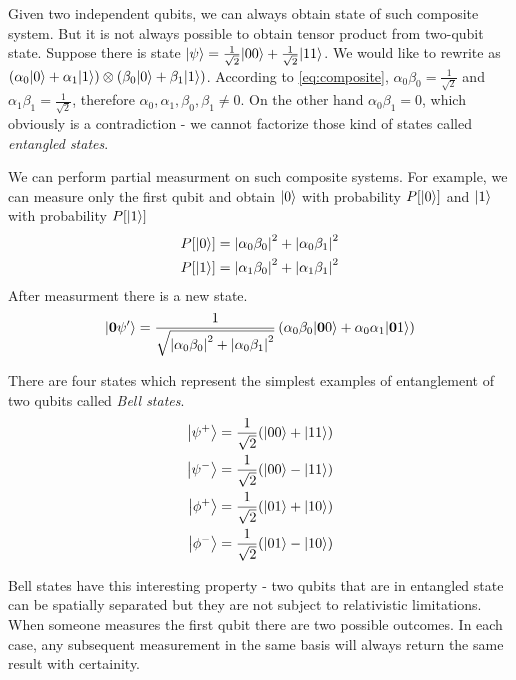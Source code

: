 \begin{multicols*}{2}
Given two independent qubits, we can always obtain state of such composite system. But it is not always possible to obtain tensor product from two-qubit state. Suppose there is state ${\left\vert{\psi}\right\rangle} = \frac{1}{\sqrt{2}}{\left\vert{00}\right\rangle}+\frac{1}{\sqrt{2}}{\left\vert{11}\right\rangle}$. We would like to rewrite as $(\alpha_0{\left\vert{0}\right\rangle} + \alpha_1{\left\vert{1}\right\rangle})\otimes(\beta_0{\left\vert{0}\right\rangle} + \beta_1{\left\vert{1}\right\rangle})$. According to \eqref{eq:composite}, $\alpha_0\beta_0 = \frac{1}{\sqrt{2}}$ and $\alpha_1\beta_1 = \frac{1}{\sqrt{2}}$, therefore $\alpha_0, \alpha_1, \beta_0, \beta_1 \neq 0$. On the other hand $\alpha_0\beta_1 = 0$, which obviously is a contradiction - we cannot factorize those kind of states called \textit{entangled states}.

We can perform partial measurment on such composite systems. For example, we can measure only the first qubit  and obtain ${\left\vert{0}\right\rangle}$ with probability $P[{\left\vert{0}\right\rangle}]$ and ${\left\vert{1}\right\rangle}$ with probability $P[{\left\vert{1}\right\rangle}]$
\begin{align*}
P[{\left\vert{0}\right\rangle}] = \left| \alpha_0\beta_0 \right|^2 + \left| \alpha_0\beta_1 \right|^2\\
P[{\left\vert{1}\right\rangle}] = \left| \alpha_1\beta_0 \right|^2 + \left| \alpha_1\beta_1 \right|^2
\end{align*}
After measurment there is a new state.
\begin{align*}
{\left\vert{\boldsymbol{0}\psi'}\right\rangle} = \frac{1}{\sqrt{ \left| \alpha_0\beta_0 \right|^2 + \left| \alpha_0\beta_1 \right|^2}}\left(\alpha_0\beta_0{\left\vert{\boldsymbol{0}0}\right\rangle} + \alpha_0\alpha_1{\left\vert{\boldsymbol{0}1}\right\rangle}\right)
\end{align*}

There are four states which represent the simplest examples of entanglement of two qubits called \textit{Bell states}.
\begin{align*}
\begin{split}
\label{eq:bell_states}
{\left\vert{\psi^+}\right\rangle} &=  \frac{1}{\sqrt{2}}({\left\vert{00}\right\rangle}+{\left\vert{11}\right\rangle})\\
{\left\vert{\psi^-}\right\rangle} &=  \frac{1}{\sqrt{2}}({\left\vert{00}\right\rangle}-{\left\vert{11}\right\rangle})\\
{\left\vert{\phi^+}\right\rangle} &=  \frac{1}{\sqrt{2}}({\left\vert{01}\right\rangle}+{\left\vert{10}\right\rangle})\\
{\left\vert{\phi^-}\right\rangle} &=  \frac{1}{\sqrt{2}}({\left\vert{01}\right\rangle}-{\left\vert{10}\right\rangle})
\end{split}
\end{align*}

Bell states have this interesting property - two qubits that are in entangled state can be spatially separated but they are not subject to relativistic limitations. When someone measures the first qubit there are two possible outcomes. In each case, any subsequent measurement in the same basis will always return the same result with certainity. 

\end{multicols*}
